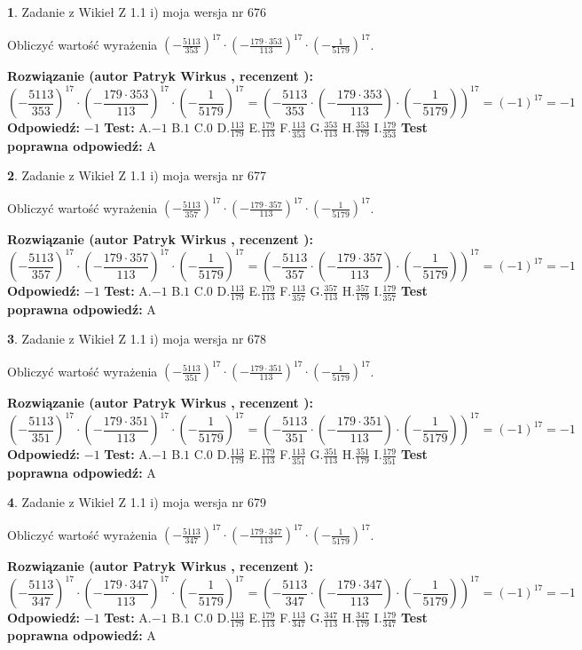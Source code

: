 \documentclass[12pt, a4paper]{article}
\theoremstyle{definition} %
\newtheorem{zad}{}
\newcommand{\zadStart}[1]{\begin{zad}#1\newline}
\newcommand{\zadStop}{\end{zad}}
\newcommand{\rozwStart}[2]{\noindent \textbf{Rozwiązanie (autor #1 , recenzent #2): }\newline}
\newcommand{\rozwStop}{\newline}
\newcommand{\odpStart}{\noindent \textbf{Odpowiedź:}\newline}
\newcommand{\odpStop}{\newline}
\newcommand{\testStart}{\noindent \textbf{Test:}\newline}
\newcommand{\testStop}{\newline}
\newcommand{\kluczStart}{\noindent \textbf{Test poprawna odpowiedź:}\newline}
\newcommand{\kluczStop}{\newline}
\begin{document}
\zadStart{Zadanie z Wikieł Z 1.1 i) moja wersja nr 676}

Obliczyć wartość wyrażenia $(-\frac{5113}{353})^{17} \cdot (-\frac{179 \cdot 353}{113})^{17} \cdot (-\frac{1}{5179})^{17}$.
\zadStop
\rozwStart{Patryk Wirkus}{}
$$(-\frac{5113}{353})^{17} \cdot (-\frac{179 \cdot 353}{113})^{17} \cdot (-\frac{1}{5179})^{17} = (-\frac{5113}{353} \cdot (-\frac{179 \cdot 353}{113}) \cdot (-\frac{1}{5179}))^{17} = (-1)^{17} = -1$$
\rozwStop
\odpStart
$-1$
\odpStop
\testStart
A.$-1$ B.$1$ C.$0$ D.$\frac{113}{179}$ E.$\frac{179}{113}$
F.$\frac{113}{353}$ G.$\frac{353}{113}$
H.$\frac{353}{179}$
I.$\frac{179}{353}$
\testStop
\kluczStart
A
\kluczStop



\zadStart{Zadanie z Wikieł Z 1.1 i) moja wersja nr 677}

Obliczyć wartość wyrażenia $(-\frac{5113}{357})^{17} \cdot (-\frac{179 \cdot 357}{113})^{17} \cdot (-\frac{1}{5179})^{17}$.
\zadStop
\rozwStart{Patryk Wirkus}{}
$$(-\frac{5113}{357})^{17} \cdot (-\frac{179 \cdot 357}{113})^{17} \cdot (-\frac{1}{5179})^{17} = (-\frac{5113}{357} \cdot (-\frac{179 \cdot 357}{113}) \cdot (-\frac{1}{5179}))^{17} = (-1)^{17} = -1$$
\rozwStop
\odpStart
$-1$
\odpStop
\testStart
A.$-1$ B.$1$ C.$0$ D.$\frac{113}{179}$ E.$\frac{179}{113}$
F.$\frac{113}{357}$ G.$\frac{357}{113}$
H.$\frac{357}{179}$
I.$\frac{179}{357}$
\testStop
\kluczStart
A
\kluczStop



\zadStart{Zadanie z Wikieł Z 1.1 i) moja wersja nr 678}

Obliczyć wartość wyrażenia $(-\frac{5113}{351})^{17} \cdot (-\frac{179 \cdot 351}{113})^{17} \cdot (-\frac{1}{5179})^{17}$.
\zadStop
\rozwStart{Patryk Wirkus}{}
$$(-\frac{5113}{351})^{17} \cdot (-\frac{179 \cdot 351}{113})^{17} \cdot (-\frac{1}{5179})^{17} = (-\frac{5113}{351} \cdot (-\frac{179 \cdot 351}{113}) \cdot (-\frac{1}{5179}))^{17} = (-1)^{17} = -1$$
\rozwStop
\odpStart
$-1$
\odpStop
\testStart
A.$-1$ B.$1$ C.$0$ D.$\frac{113}{179}$ E.$\frac{179}{113}$
F.$\frac{113}{351}$ G.$\frac{351}{113}$
H.$\frac{351}{179}$
I.$\frac{179}{351}$
\testStop
\kluczStart
A
\kluczStop



\zadStart{Zadanie z Wikieł Z 1.1 i) moja wersja nr 679}

Obliczyć wartość wyrażenia $(-\frac{5113}{347})^{17} \cdot (-\frac{179 \cdot 347}{113})^{17} \cdot (-\frac{1}{5179})^{17}$.
\zadStop
\rozwStart{Patryk Wirkus}{}
$$(-\frac{5113}{347})^{17} \cdot (-\frac{179 \cdot 347}{113})^{17} \cdot (-\frac{1}{5179})^{17} = (-\frac{5113}{347} \cdot (-\frac{179 \cdot 347}{113}) \cdot (-\frac{1}{5179}))^{17} = (-1)^{17} = -1$$
\rozwStop
\odpStart
$-1$
\odpStop
\testStart
A.$-1$ B.$1$ C.$0$ D.$\frac{113}{179}$ E.$\frac{179}{113}$
F.$\frac{113}{347}$ G.$\frac{347}{113}$
H.$\frac{347}{179}$
I.$\frac{179}{347}$
\testStop
\kluczStart
A
\kluczStop
\end{document}
